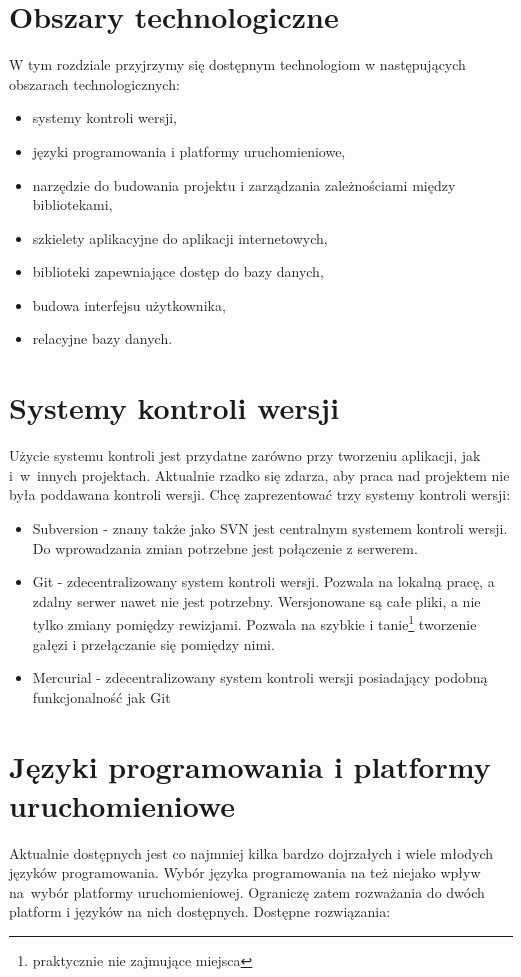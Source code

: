 \documentclass[a4paper,onecolumn,oneside,11pt,wide,floatssmall]{mwrep}
\theoremstyle{definition}
\theoremstyle{plain}%
\theoremstyle{remark}
\begin{document}
\section{Obszary technologiczne}
W tym rozdziale przyjrzymy się dostępnym technologiom w następujących obszarach technologicznych:

\begin{itemize}
  \item systemy kontroli wersji,
  \item języki programowania i platformy uruchomieniowe,
  \item narzędzie do budowania projektu i zarządzania zależnościami między bibliotekami,
  \item szkielety aplikacyjne do aplikacji internetowych,
  \item biblioteki zapewniające dostęp do bazy danych,
  \item budowa interfejsu użytkownika,
  \item relacyjne bazy danych.
\end{itemize}

\section{Systemy kontroli wersji}
Użycie systemu kontroli jest przydatne zarówno przy tworzeniu aplikacji, jak \mbox{i w innych} projektach. Aktualnie rzadko się zdarza, aby praca nad projektem nie była poddawana kontroli wersji. Chcę zaprezentować trzy systemy kontroli wersji:

\begin{itemize}
  \item Subversion - znany także jako SVN jest centralnym systemem kontroli wersji. Do wprowadzania zmian potrzebne jest połączenie z serwerem.
  \item Git \cite{gitHome} - zdecentralizowany system kontroli wersji. Pozwala na lokalną pracę, a zdalny serwer nawet nie jest potrzebny. Wersjonowane są całe pliki, a nie tylko zmiany pomiędzy rewizjami. Pozwala na szybkie i tanie\footnote{praktycznie nie zajmujące miejsca} tworzenie gałęzi i przełączanie się pomiędzy nimi.
  \item Mercurial - zdecentralizowany system kontroli wersji posiadający podobną funkcjonalność jak Git
\end{itemize}

\section{Języki programowania i platformy uruchomieniowe}
Aktualnie dostępnych jest co najmniej kilka bardzo dojrzałych i wiele młodych języków programowania. Wybór języka programowania na też niejako wpływ \mbox{na wybór} platformy uruchomieniowej. Ograniczę zatem rozważania do dwóch platform i języków na nich dostępnych. Dostępne rozwiązania:
\end{document}
